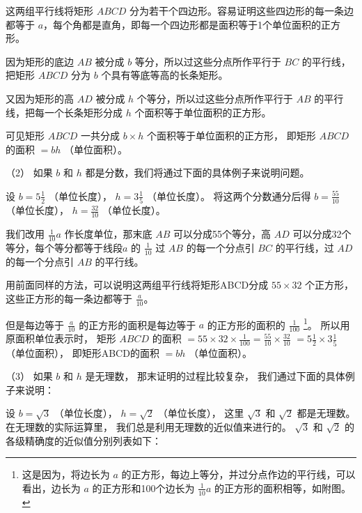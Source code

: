 这两组平行线将矩形 \(ABCD\)
分为若干个四边形。容易证明这些四边形的每一条边都等于
\(a\)，每个角都是直角，即每一个四边形都是面积等于1个单位面积的正方形。

因为矩形的底边 \(AB\) 被分成 \(b\) 等分，所以过这些分点所作平行于 \(BC\)
的平行线，把矩形 \(ABCD\) 分为 \(b\) 个具有等底等高的长条矩形。

又因为矩形的高 \(AD\) 被分成 \(h\) 个等分，所以过这些分点所作平行于
\(AB\) 的平行线，把每一个长条矩形分成 \(h\) 个面积等于单位面积的正方形。

可见矩形 \(ABCD\) 一共分成 \(b \times h\) 个面积等于单位面积的正方形，
即矩形 \(ABCD\) 的面积 \(= bh\) （单位面积）。

（2） 如果 \(b\) 和 \(h\) 都是分数，我们将通过下面的具体例子来说明问题。

设 \(b = 5\frac{1}{2}\) （单位长度）， \(h = 3\frac{1}{5}\)
（单位长度）。 将这两个分数通分后得 \(b = \frac{55}{10}\) （单位长度），
\(h = \frac{32}{10}\) （单位长度）。

我们改用 \(\frac{1}{10} a\) 作长度单位，那末底 \(AB\)
可以分成55个等分，高 \(AD\) 可以分成32个等分，每个等分都等于线段\(a\) 的
\(\frac{1}{10}\) 过 \(AB\) 的每一个分点引 \(BC\) 的平行线，过 \(AD\)
的每一个分点引 \(AB\) 的平行线。

用前面同样的方法，可以说明这两组平行线将矩形ABCD分成 \(55\times32\)
个正方形，这些正方形的每一条边都等于 \(\frac{a}{10}\)。

但是每边等于 \(\frac{a}{10}\) 的正方形的面积是每边等于 \(a\)
的正方形的面积的 \(\frac{1}{100}\) \footnote{这是因为，将边长为 \(a\)
  的正方形，每边上等分，并过分点作边的平行线，可以看出，边长为 \(a\)
  的正方形和100个边长为 \(\frac{1}{10} a\) 的正方形的面积相等，如附图。}。
所以用原面积单位表示时， 矩形 \(ABCD\) 的面积
\(= 55 \times 32 \times \frac{1}{100} = \frac{55}{10} \times \frac{32}{10}\)
\(= 5\frac{1}{2} \times 3\frac{1}{5}\) （单位面积）， 即矩形ABCD的面积
\(= bh\) （单位面积）。

（3） 如果 \(b\) 和 \(h\) 是无理数， 那末证明的过程比较复杂，
我们通过下面的具体例子来说明：

设 \(b = \sqrt{3}\) （单位长度）， \(h = \sqrt{2}\) （单位长度）， 这里
\(\sqrt{3}\) 和 \(\sqrt{2}\) 都是无理数。 在无理数的实际运算里，
我们总是利用无理数的近似值来进行的。 \(\sqrt{3}\) 和 \(\sqrt{2}\)
的各级精确度的近似值分别列表如下：

